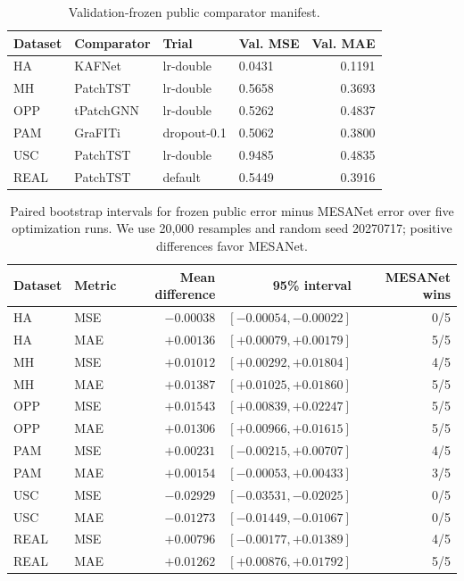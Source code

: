 \documentclass[letterpaper,10pt]{article}
\begin{document}




\begin{table}[H]
\centering
\setlength{\tabcolsep}{5pt}
\caption{Validation-frozen public comparator manifest.}
\label{tab:v671-comparator-manifest}
\begin{tabular}{@{}llllr@{}}
\toprule
Dataset & Comparator & Trial & Val. MSE & Val. MAE \\
\midrule
HA & KAFNet & lr-double & 0.0431 & 0.1191 \\
MH & PatchTST & lr-double & 0.5658 & 0.3693 \\
OPP & tPatchGNN & lr-double & 0.5262 & 0.4837 \\
PAM & GraFITi & dropout-0.1 & 0.5062 & 0.3800 \\
USC & PatchTST & lr-double & 0.9485 & 0.4835 \\
REAL & PatchTST & default & 0.5449 & 0.3916 \\
\bottomrule
\end{tabular}
\end{table}

\begin{table}[H]
\centering
\setlength{\tabcolsep}{5pt}
\caption{Paired bootstrap intervals for frozen public error minus MESANet
error over five optimization runs. We use 20,000 resamples and random seed
20270717; positive differences favor MESANet.}
\label{tab:v671-paired-detail}
\begin{tabular}{@{}llrrr@{}}
\toprule
Dataset & Metric & Mean difference & 95\% interval & MESANet wins \\
\midrule
HA & MSE & $-0.00038$ & $[-0.00054,-0.00022]$ & 0/5 \\
HA & MAE & $+0.00136$ & $[+0.00079,+0.00179]$ & 5/5 \\
MH & MSE & $+0.01012$ & $[+0.00292,+0.01804]$ & 4/5 \\
MH & MAE & $+0.01387$ & $[+0.01025,+0.01860]$ & 5/5 \\
OPP & MSE & $+0.01543$ & $[+0.00839,+0.02247]$ & 5/5 \\
OPP & MAE & $+0.01306$ & $[+0.00966,+0.01615]$ & 5/5 \\
PAM & MSE & $+0.00231$ & $[-0.00215,+0.00707]$ & 4/5 \\
PAM & MAE & $+0.00154$ & $[-0.00053,+0.00433]$ & 3/5 \\
USC & MSE & $-0.02929$ & $[-0.03531,-0.02025]$ & 0/5 \\
USC & MAE & $-0.01273$ & $[-0.01449,-0.01067]$ & 0/5 \\
REAL & MSE & $+0.00796$ & $[-0.00177,+0.01389]$ & 4/5 \\
REAL & MAE & $+0.01262$ & $[+0.00876,+0.01792]$ & 5/5 \\
\bottomrule
\end{tabular}
\end{table}
\end{document}
